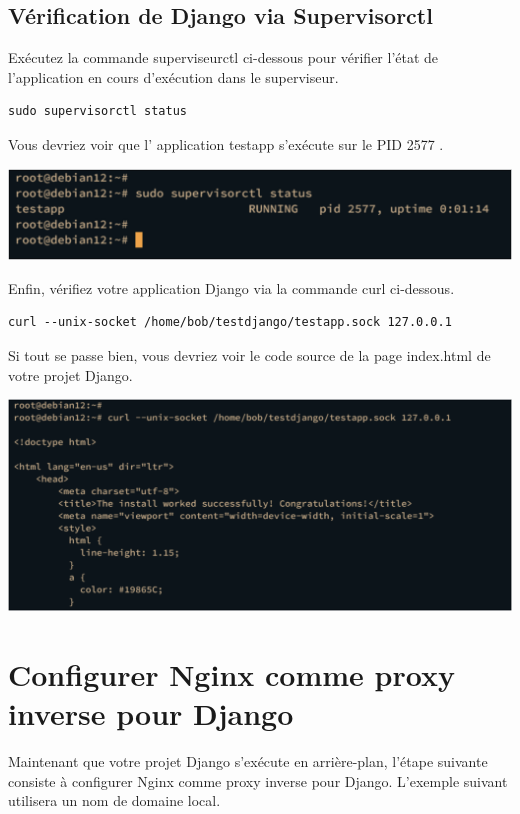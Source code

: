 \documentclass{article}
\begin{document}
\subsection{Vérification de Django via Supervisorctl}
Exécutez la commande superviseurctl ci-dessous pour vérifier l'état de l'application en cours d'exécution dans le superviseur.

\begin{verbatim}
sudo supervisorctl status
\end{verbatim}

Vous devriez voir que l' application testapp s'exécute sur le PID 2577 .

\begin{center}
\includegraphics[width=15cm]{images/image22.png}
\end{center}

Enfin, vérifiez votre application Django via la commande curl ci-dessous.

\begin{verbatim}
curl --unix-socket /home/bob/testdjango/testapp.sock 127.0.0.1
\end{verbatim}

Si tout se passe bien, vous devriez voir le code source de la page index.html de votre projet Django.

\begin{center}
\includegraphics[width=15cm]{images/image23.png}
\end{center}

\section{Configurer Nginx comme proxy inverse pour Django}
Maintenant que votre projet Django s'exécute en arrière-plan, l'étape suivante consiste à configurer Nginx comme proxy inverse pour Django. L'exemple suivant utilisera un nom de domaine local.
\end{document}

